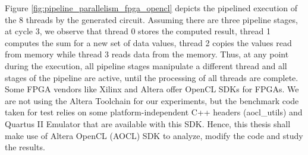 Figure \ref{fig:pipeline_parallelism_fpga_opencl} depicts the pipelined execution of the 8 threads by the generated circuit. Assuming there are three pipeline stages, at cycle 3, we observe that thread 0 stores the computed result, thread 1 computes the sum for a new set of data values, thread 2 copies the values read from memory while thread 3 reads data from the memory. Thus, at any point during the execution, all pipeline stages manipulate a different thread and all stages of the pipeline are active, until the processing of all threads are complete. \newline \newline
Some FPGA vendors like Xilinx and Altera offer OpenCL SDKs for FPGAs. We are not using the Altera Toolchain for our experiments, but the benchmark code taken for test relies on some platform-independent C++ headers (aocl\_utils) and Quartus II Emulator that are available with this SDK. Hence, this thesis shall make use of Altera OpenCL (AOCL) SDK to analyze, modify the code and study the results.
